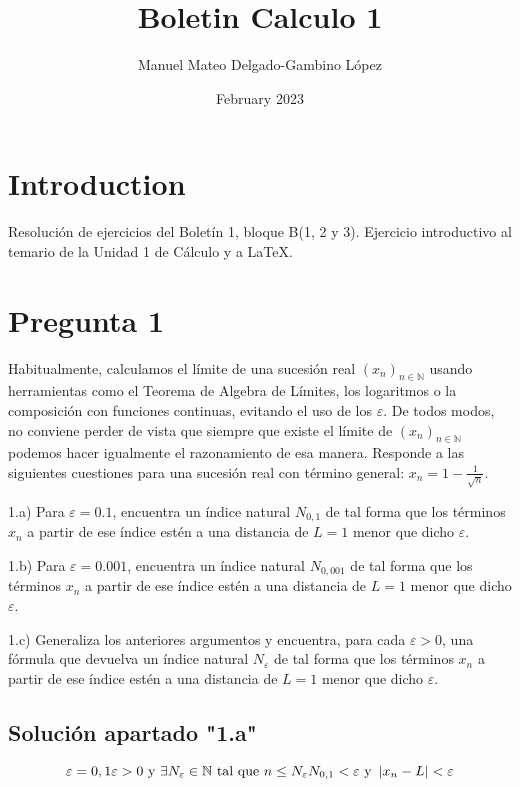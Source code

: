 \documentclass{article}
\title{Boletin Calculo 1}
\author{Manuel Mateo Delgado-Gambino López}
\date{February 2023}
\begin{document}
\maketitle

\section{Introduction}
Resolución de ejercicios del Boletín 1, bloque B(1, 2 y 3).
Ejercicio introductivo al temario de la Unidad 1 de Cálculo y a LaTeX.

\section{Pregunta 1}

\setlength{\parindent}{0cm}

Habitualmente, calculamos el límite de una sucesión real $(x_{n})_{n \in \mathbb{N}}$ usando herramientas como el Teorema de Algebra de Límites, los logaritmos o la composición con funciones continuas, evitando el uso de los $\varepsilon$. De todos modos, no conviene perder de vista que siempre que existe el límite de $(x_{n})_{n \in \mathbb{N}}$ podemos hacer igualmente el razonamiento de esa manera. Responde a las siguientes cuestiones para una sucesión real con término general:
$x_{n} = 1 - \frac{1}{\sqrt{n}}$.
    
    \setlength{\parindent}{1cm}
        1.a) Para $\varepsilon = 0.1$, encuentra un índice natural $N_{0,1}$ de tal forma que los términos $x_n$ a partir de ese índice estén a una distancia de $L=1$ menor que dicho $\varepsilon$.

        1.b) Para $\varepsilon = 0.001$, encuentra un índice natural $N_{0,001}$ de tal forma que los términos $x_n$ a partir de ese índice estén a una distancia de $L=1$ menor que dicho $\varepsilon$.

        1.c) Generaliza los anteriores argumentos y encuentra, para cada $\varepsilon > 0$, una fórmula que devuelva un índice natural $N_{\varepsilon}$ de tal forma que los términos $x_n$ a partir de ese índice estén a una distancia de $L=1$ menor que dicho $\varepsilon$.
    

    \subsection{Solución apartado "1.a"}
\begin{equation}
\varepsilon = 0,1 \\
\varepsilon > 0 \text{ y } \exists N_{\varepsilon} \in \mathbb{N} \text{ tal que } n \leq N_{\varepsilon} \\
N_{0,1} < \varepsilon \text{ y } \left| x_{n} - L \right| < \varepsilon
\end{equation}
\end{document}
